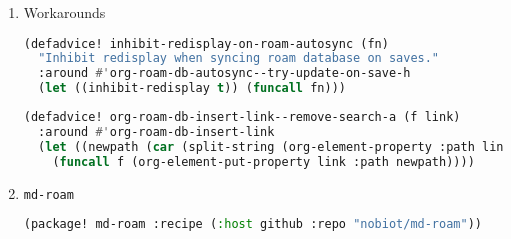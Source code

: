 \documentclass[11pt]{article}
\begin{document}
\begin{enumerate}
\begin{enumerate}
  \begin{lstlisting}[language=Lisp]
(after! org-roam
  (setq org-roam-capture-templates
        '(("d" "default" plain "%?"
           :target (file+head "%<%Y%m%d%H%M%S>.org" "#+title: ${title}
#+language: pt
")
           :unnarrowed t)
          ("m" "math" plain "%?"
           :target (file+head "math/%<%Y%m%d%H%M%S>.org" "#+title: ${title}
#+language: pt
")
           :unnarrowed t))))
          
\end{lstlisting}
  \item Roam-ref
  \label{sec:roam-ref}

  \begin{lstlisting}[language=Lisp]
(setq org-roam-capture-ref-templates
      '(("m" "math" plain "%?"
           :target (file+head "math/%<%Y%m%d%H%M%S>.org" "#+title: ${title}\n\n${body}")
           :unnarrowed t)
        ("fr" "Add to my future-read list" entry "* ${title}\n%?"
         :target (file+olp "to-read.org" ("${title}"))
         :empty-lines-before 1 nil nil)
        ("r" "ref" plain "%?" :target
         (file+head "${slug}.org" "#+title: ${title}")
         :unnarrowed t)))
\end{lstlisting}
\end{enumerate}

  \item Workarounds
  \label{sec:workarounds}

  \begin{lstlisting}[language=Lisp]
(defadvice! inhibit-redisplay-on-roam-autosync (fn)
  "Inhibit redisplay when syncing roam database on saves."
  :around #'org-roam-db-autosync--try-update-on-save-h
  (let ((inhibit-redisplay t)) (funcall fn)))
\end{lstlisting}

\begin{lstlisting}[language=Lisp]
(defadvice! org-roam-db-insert-link--remove-search-a (f link)
  :around #'org-roam-db-insert-link
  (let ((newpath (car (split-string (org-element-property :path link) "::"))))
    (funcall f (org-element-put-property link :path newpath))))
\end{lstlisting}
  \item \texttt{md-roam}
  \label{sec:md-roam}

  \begin{lstlisting}[language=Lisp]
(package! md-roam :recipe (:host github :repo "nobiot/md-roam"))
\end{lstlisting}
\end{enumerate}
\end{document}
